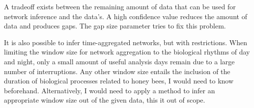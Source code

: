 A tradeoff exists between the remaining amount of data that can be used for network inference and the data's.
A high confidence value reduces the amount of data and produces gaps.
The gap size parameter tries to fix this problem. 

It is also possible to infer time-aggregated networks, but with restrictions.
When limiting the window size for network aggregation to the biological rhythms of day and night, only a small amount of useful analysis days remain due to a large number of interruptions.
Any other window size entails the inclusion of the duration of biological processes related to honey bees, I would need to know beforehand. Alternatively, I would need to apply a method to infer an appropriate window size out of the given data, this it out of scope.